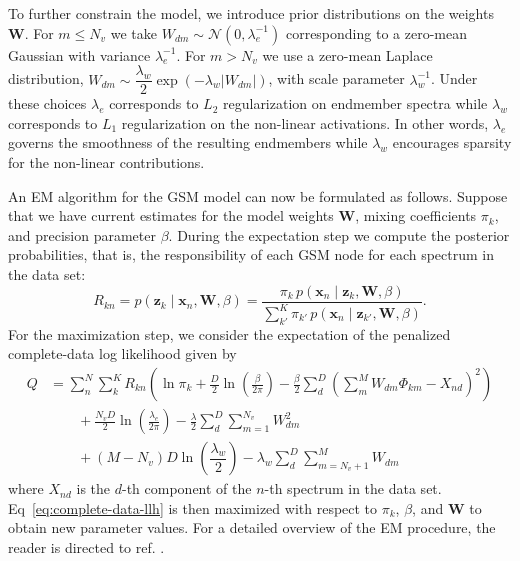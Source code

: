 \documentclass[remotesensing,article,submit,pdftex,moreauthors]{Definitions/mdpi}
\begin{document}
To further constrain the model, we introduce prior distributions on the weights $\mathbf{W}$. For $m\leq N_v$ we take $W_{dm}\sim\mathcal{N}(0, \lambda_e^{-1})$ corresponding to a zero-mean Gaussian with variance $\lambda_e^{-1}$. For $m>N_v$ we use a zero-mean Laplace distribution, $W_{dm}\sim\dfrac{\lambda_w}{2}\exp(-\lambda_w\lvert W_{dm}\rvert)$, with scale parameter $\lambda_w^{-1}$. Under these choices $\lambda_e$ corresponds to $L_2$ regularization on endmember spectra while $\lambda_w$ corresponds to $L_1$ regularization on the non-linear activations. In other words, $\lambda_e$ governs the smoothness of the resulting endmembers while $\lambda_w$ encourages sparsity for the non-linear contributions.

An EM algorithm for the GSM model can now be formulated as follows. Suppose that we have current estimates for the model weights $\mathbf{W}$, mixing coefficients $\pi_k$, and precision parameter $\beta$. During the expectation step we compute the posterior probabilities, that is, the responsibility of each GSM node for each spectrum in the data set:
\begin{equation}\label{eq:responsibility}
    R_{kn}  = p(\mathbf{z}_k \mid \mathbf{x}_n, \mathbf{W}, \beta) = \dfrac{\pi_k \, p(\mathbf{x}_n \mid \mathbf{z}_k, \mathbf{W}, \beta)}{\sum\limits_{k'}^K \pi_{k'} \, p(\mathbf{x}_n \mid \mathbf{z}_{k'}, \mathbf{W}, \beta)}.
\end{equation}
For the maximization step, we consider the expectation of the penalized complete-data log likelihood given by
\begin{equation}\label{eq:complete-data-llh}
\begin{aligned}
    Q &= \sum_n^N\sum_k^K R_{kn} \left(\ln\pi_k + \frac{D}{2}\ln\left(\frac{\beta}{2\pi}\right) - \frac{\beta}{2}\sum_d^D\left(\sum_m^M W_{dm}\Phi_{km} - X_{nd}\right)^2\right) \\ 
    &\qquad + \frac{N_vD}{2}\ln\left(\frac{\lambda_e}{2\pi}\right) - \frac{\lambda}{2}\sum_d^D \sum_{m=1}^{N_v} W_{dm}^2  \\ 
    &\qquad + (M-N_v)D\ln\left(\dfrac{\lambda_w}{2}\right) - \lambda_w\sum_d^D\sum_{m=N_v+1}^{M} W_{dm}
\end{aligned}
\end{equation}
where $X_{nd}$ is the $d$-th component of the $n$-th spectrum in the data set. Eq~\ref{eq:complete-data-llh} is then maximized with respect to $\pi_k$, $\beta$, and $\mathbf{W}$ to obtain new parameter values. For a detailed overview of the EM procedure, the reader is directed to ref. \cite{bishop-prml}.
\end{document}
